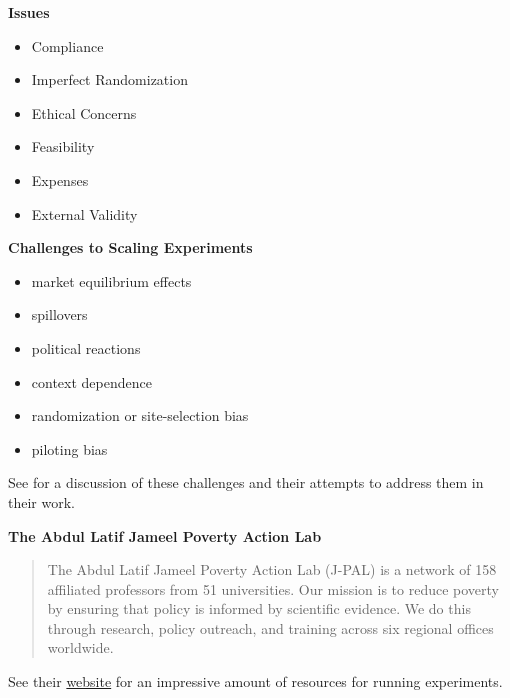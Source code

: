 \begin{frame}\textbf{Issues}\vspace{0.3cm}

\begin{itemize}\setlength\itemsep{0.5em}
\item Compliance
\item Imperfect Randomization
\item Ethical Concerns
\item Feasibility
\item Expenses
\item External Validity
\end{itemize}
\end{frame}
\begin{frame}\textbf{Challenges to Scaling Experiments}\vspace{0.3cm}

\begin{itemize}\setlength\itemsep{0.5em}
\item market equilibrium effects
\item spillovers
\item political reactions
\item context dependence
\item randomization or site-selection bias
\item piloting bias\vspace{0.3cm}
\end{itemize}

See  for a discussion of these challenges and their attempts to address them in their work.
\end{frame}
\begin{frame}\textbf{The Abdul Latif Jameel Poverty Action Lab}\vspace{0.3cm}

\begin{quote} The Abdul Latif Jameel Poverty Action Lab (J-PAL) is a network of 158 affiliated professors from 51 universities. Our mission is to reduce poverty by ensuring that policy is informed by scientific evidence. We do this through research, policy outreach, and training across six regional offices worldwide.\\\vspace{0.3cm}
\end{quote}


See their \href{https://www.povertyactionlab.org}{website} for an impressive amount of resources for running experiments.
\end{frame}
